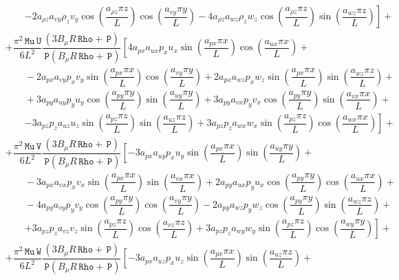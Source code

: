 \documentclass[10pt]{article}
\newcommand{\Rho}{\,\mathtt{Rho}}
\newcommand{\PP}{\,\mathtt{P}}
\newcommand{\U}{\,\mathtt{U}}
\newcommand{\V}{\,\mathtt{V}}
\newcommand{\W}{\,\mathtt{W}}
\newcommand{\MU}{\,\mathtt{Mu}}
\begin{document}
\begin{equation}
\begin{split}
    &\qquad\left. -2 a_{\rho z} a_{vy} \rho_z v_y \cos\left(\dfrac{a_{\rho z} \pi z}{L}\right) \cos\left(\dfrac{a_{vy} \pi y}{L}\right)-4 a_{\rho z} a_{wz} \rho_z w_z \cos\left(\dfrac{a_{\rho z} \pi z}{L}\right) \sin\left(\dfrac{a_{wz} \pi z}{L}\right)\right] +\\
%
&+ \dfrac{ \pi^2 \MU \U }{6L^2} \dfrac{(3 B_\mu R \Rho+\PP)}{\PP (B_\mu R \Rho+\PP) }  \left[4 a_{px} a_{ux} p_x u_x \sin\left(\dfrac{a_{px} \pi x}{L}\right) \cos\left(\dfrac{a_{ux} \pi x}{L}\right)+\right.\\
    &\qquad-2 a_{px} a_{vy} p_x v_y \sin\left(\dfrac{a_{px} \pi x}{L}\right) \cos\left(\dfrac{a_{vy} \pi y}{L}\right)+2 a_{px} a_{wz} p_x w_z \sin\left(\dfrac{a_{px} \pi x}{L}\right) \sin\left(\dfrac{a_{wz} \pi z}{L}\right)+\\
    &\qquad+3 a_{py} a_{uy} p_y u_y \cos\left(\dfrac{a_{py} \pi y}{L}\right) \sin\left(\dfrac{a_{uy} \pi y}{L}\right)+3 a_{py} a_{vx} p_y v_x \cos\left(\dfrac{a_{py} \pi y}{L}\right) \sin\left(\dfrac{a_{vx} \pi x}{L}\right)+\\
    &\qquad\left. -3 a_{pz} p_z a_{uz} u_z \sin\left(\dfrac{a_{pz} \pi z}{L}\right) \sin\left(\dfrac{a_{uz} \pi z}{L}\right)+3 a_{pz} p_z a_{wx} w_x \sin\left(\dfrac{a_{pz} \pi z}{L}\right) \cos\left(\dfrac{a_{wx} \pi x}{L}\right)\right] +\\
%
&+ \dfrac{  \pi^2 \MU \V }{6L^2} \dfrac{(3 B_\mu R \Rho+\PP)}{\PP (B_\mu R \Rho+\PP) } \left[-3 a_{px} a_{uy} p_x u_y \sin\left(\dfrac{a_{px} \pi x}{L}\right) \sin\left(\dfrac{a_{uy} \pi y}{L}\right)+\right.\\
    &\qquad-3 a_{px} a_{vx} p_x v_x \sin\left(\dfrac{a_{px} \pi x}{L}\right) \sin\left(\dfrac{a_{vx} \pi x}{L}\right)+2 a_{py} a_{ux} p_y u_x \cos\left(\dfrac{a_{py} \pi y}{L}\right) \cos\left(\dfrac{a_{ux} \pi x}{L}\right)+\\
    &\qquad-4 a_{py} a_{vy} p_y v_y \cos\left(\dfrac{a_{py} \pi y}{L}\right) \cos\left(\dfrac{a_{vy} \pi y}{L}\right)-2 a_{py} a_{wz} p_y w_z \cos\left(\dfrac{a_{py} \pi y}{L}\right) \sin\left(\dfrac{a_{wz} \pi z}{L}\right)+\\
    &\qquad\left. +3 a_{pz} p_z a_{vz} v_z \sin\left(\dfrac{a_{pz} \pi z}{L}\right) \cos\left(\dfrac{a_{vz} \pi z}{L}\right)+3 a_{pz} p_z a_{wy} w_y \sin\left(\dfrac{a_{pz} \pi z}{L}\right) \cos\left(\dfrac{a_{wy} \pi y}{L}\right)\right] +\\
%
&+\dfrac{  \pi^2 \MU \W }{6L^2} \dfrac{(3 B_\mu R \Rho+\PP)}{\PP (B_\mu R \Rho+\PP) }   \left[-3 a_{px} a_{uz} p_x u_z \sin\left(\dfrac{a_{px} \pi x}{L}\right) \sin\left(\dfrac{a_{uz} \pi z}{L}\right)+\right.\\

\end{split}
\end{equation}
\end{document}
